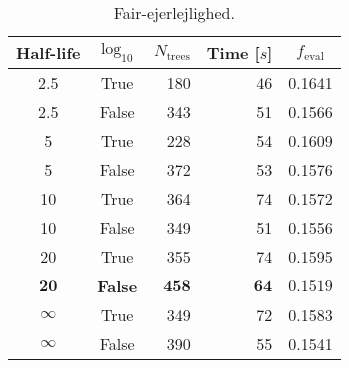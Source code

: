 
\begin{table}[]
  \begin{tabular}{@{}ccrrc@{}}
    Half-life & $\log_{10}$ & $N_\mathrm{trees}$ & Time [$s$] & $f_\mathrm{eval}$ \\
    \midrule
    \num{2.5} & True & \num{180} & \num{46} & \num{0.1641} \\
    \num{2.5} & False & \num{343} & \num{51} & \num{0.1566} \\
    \num{5} & True & \num{228} & \num{54} & \num{0.1609} \\
    \num{5} & False & \num{372} & \num{53} & \num{0.1576} \\
    \num{10} & True & \num{364} & \num{74} & \num{0.1572} \\
    \num{10} & False & \num{349} & \num{51} & \num{0.1556} \\
    \num{20} & True & \num{355} & \num{74} & \num{0.1595} \\
    $\mathbf{20}$ & \textbf{False} & $\mathbf{458}$ & $\mathbf{64}$ & $\mathbf{0.1519}$ \\
    $\infty$ & True & \num{349} & \num{72} & \num{0.1583} \\
    $\infty$ & False & \num{390} & \num{55} & \num{0.1541} \\
  \end{tabular}
  \caption{\label{tab:h:HPO_initial_Fair-ejerlejlighed}Fair-ejerlejlighed.}
\end{table}


























